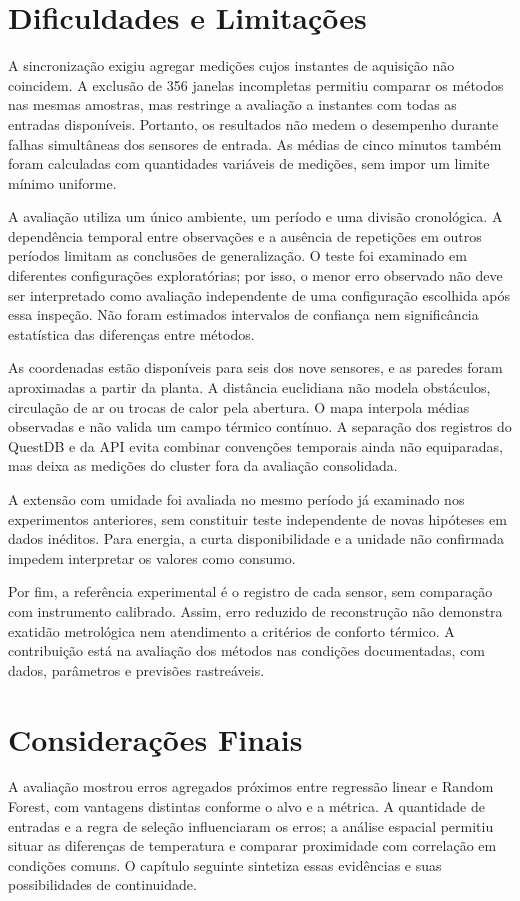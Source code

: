 


\section{Dificuldades e Limitações}
\label{sec:dificuldades_limitacoes}

A sincronização exigiu agregar medições cujos instantes de aquisição
não coincidem. A exclusão de 356 janelas incompletas permitiu comparar
os métodos nas mesmas amostras, mas restringe a avaliação a instantes
com todas as entradas disponíveis. Portanto, os resultados não medem
o desempenho durante falhas simultâneas dos sensores de entrada.
As médias de cinco minutos também foram calculadas com quantidades
variáveis de medições, sem impor um limite mínimo uniforme.

A avaliação utiliza um único ambiente, um período e uma divisão
cronológica. A dependência temporal entre observações e a ausência
de repetições em outros períodos limitam as conclusões de generalização.
O teste foi examinado em diferentes configurações exploratórias;
por isso, o menor erro observado não deve ser interpretado como
avaliação independente de uma configuração escolhida após essa inspeção.
Não foram estimados intervalos de confiança nem significância
estatística das diferenças entre métodos.

As coordenadas estão disponíveis para seis dos nove sensores, e as
paredes foram aproximadas a partir da planta. A distância euclidiana
não modela obstáculos, circulação de ar ou trocas de calor pela abertura.
O mapa interpola médias observadas e não valida um campo térmico contínuo.
A separação dos registros do QuestDB e da API evita combinar convenções
temporais ainda não equiparadas, mas deixa as medições do cluster fora
da avaliação consolidada.

A extensão com umidade foi avaliada no mesmo período já examinado
nos experimentos anteriores, sem constituir teste independente de
novas hipóteses em dados inéditos. Para energia, a curta disponibilidade
e a unidade não confirmada impedem interpretar os valores como consumo.

Por fim, a referência experimental é o registro de cada sensor, sem
comparação com instrumento calibrado. Assim, erro reduzido de reconstrução
não demonstra exatidão metrológica nem atendimento a critérios de
conforto térmico. A contribuição está na avaliação dos métodos nas
condições documentadas, com dados, parâmetros e previsões rastreáveis.

\section{Considerações Finais}
\label{sec:desenvolvimento_finais}

A avaliação mostrou erros agregados próximos entre regressão linear
e Random Forest, com vantagens distintas conforme o alvo e a métrica.
A quantidade de entradas e a regra de seleção influenciaram os erros;
a análise espacial permitiu situar as diferenças de temperatura e
comparar proximidade com correlação em condições comuns. O capítulo
seguinte sintetiza essas evidências e suas possibilidades de continuidade.
